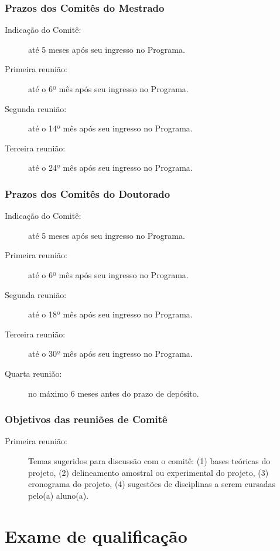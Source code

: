 \subsubsection{Prazos dos Comitês do Mestrado}
\begin{description}
\item[Indicação do Comitê:] até  5 meses após seu ingresso no Programa.
\item[Primeira reunião:] até o 6º mês após seu ingresso no Programa.
\item[Segunda reunião:] até  o 14º mês após seu ingresso no Programa.
\item[Terceira reunião:] até  o 24º mês após seu ingresso no Programa.
\end{description}

\subsubsection{Prazos dos Comitês do Doutorado}
\begin{description}
\item[Indicação do Comitê:] até 5 meses após seu ingresso no Programa.
\item[Primeira reunião:] até o 6º mês após seu ingresso no Programa.
\item[Segunda reunião:] até  o 18º mês após seu ingresso no Programa.
\item[Terceira reunião:] até  o 30º mês após seu ingresso no Programa.
\item[Quarta reunião:] no máximo 6 meses antes do prazo de depósito.
\end{description}

\subsubsection{Objetivos das reuniões de Comitê}
\begin{description}
\item[Primeira reunião:] Temas sugeridos para discussão com o comitê: (1) bases teóricas do projeto,
(2) delineamento amostral ou experimental do projeto, (3) cronograma do projeto, 
(4) sugestões de disciplinas a serem cursadas pelo(a) aluno(a).
\end{description}
\section{Exame de qualificação}
\label{sec:qualif}

